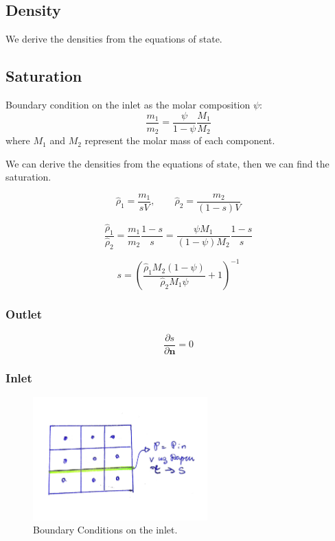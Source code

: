 \documentclass[a4paper,12pt]{article}
\begin{document}
\subsection{Density}

We derive the densities from the equations of state.

\subsection{Saturation}
    Boundary condition on the inlet as the molar
    composition \(\psi\):
    \[
        \frac{m_1}{m_2} = \frac{\psi}{1 - \psi}
        \frac{M_1}{M_2}
    \] 
    where \(M_1\) and \(M_2\) represent the molar mass 
    of each component.

    We can derive the densities from the equations of state,
    then we can find the saturation.

    \[
    \hat \rho_1 = \frac{m_1}{sV}, \qquad
    \hat \rho_2 = \frac{m_2}{(1 - s)V}
    \] 

    \[
    \frac{\hat \rho_1}{\hat \rho_2} = \frac{m_1}{m_2}
    \frac{1 - s}{s}
    = \frac{\psi M_1}{(1 - \psi) M_2}\frac{1 - s}{s}
    \] 

    \[
        s = \left( 
        \frac{\hat \rho_1 M_2(1 - \psi) }{\hat \rho_2 M_1 \psi}
    + 1 \right)^{-1}
    \] 

    \subsubsection{Outlet}

    \[
    \frac{\partial s}{\partial \bm{n}} = 0 
    \] 

    \subsubsection{Inlet}

    \begin{figure}[H]
        \centering
        \includegraphics[width=0.6\textwidth]{img/inlet.pdf}
        \caption{Boundary Conditions on the inlet.}
    \end{figure}
\end{document}
